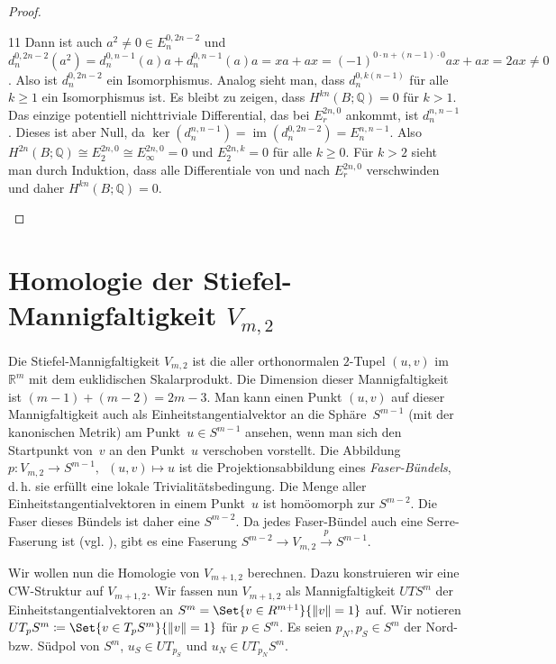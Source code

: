 \documentclass[11pt, a4paper, german]{article}
\theoremstyle{definition}
\theoremstyle{remark}
\newcommand{\R}{\mathbb{R}} %
\newcommand{\Q}{\mathbb{Q}} %
\DeclareMathOperator{\im}{im} %
\DeclarePairedDelimiter\norm{\lVert}{\rVert} %
\newcommand{\V}[2]{V_{{#2},{#1}}} %
\begin{document}
\begin{proof}
\begin{cutout}{0}{0pt}{\dimexpr\linewidth-5.5cm\relax}{11}
    Dann ist auch $a^2 \neq 0 \in E_n^{0,2n-2}$ und $d_n^{0,2n-2}(a^2) = d_n^{0,n-1}(a)a + d_n^{0,n-1}(a)a = xa + ax = (-1)^{0 \cdot n + (n-1) \cdot 0} ax + ax = 2ax \neq 0$.
    Also ist $d_n^{0,2n-2}$ ein Isomorphismus.
    Analog sieht man, dass $d_n^{0,k(n-1)}$ für alle $k \geq 1$ ein Isomorphismus ist.
    Es bleibt zu zeigen, dass $H^{kn}(B; \Q) = 0$ für $k > 1$.
    Das einzige potentiell nichttriviale Differential, das bei $E_r^{2n,0}$ ankommt, ist $d_n^{n,n-1}$.
    Dieses ist aber Null, da $\ker(d_n^{n,n-1}) = \im(d_n^{0,2n-2}) = E_n^{n,n-1}$.
    Also $H^{2n}(B; \Q) \cong E_2^{2n,0} \cong E_\infty^{2n,0} = 0$ und $E_2^{2n,k} = 0$ für alle $k \geq 0$.
    Für $k > 2$ sieht man durch Induktion, dass alle Differentiale von und nach $E_r^{2n,0}$ verschwinden und daher $H^{kn}(B; \Q) = 0$. \qedhere
  \end{cutout}
\end{proof}

\section{Homologie der Stiefel-Mannigfaltigkeit $\V{2}{m}$}

Die Stiefel-Mannigfaltigkeit $\V{2}{m}$ ist die aller orthonormalen $2$-Tupel $(u, v)$ im $\R^m$ mit dem euklidischen Skalarprodukt.
Die Dimension dieser Mannigfaltigkeit ist $(m-1) + (m-2) = 2m - 3$.
Man kann einen Punkt $(u, v)$ auf dieser Mannigfaltigkeit auch als Einheitstangentialvektor an die Sphäre~$S^{m-1}$ (mit der kanonischen Metrik) am Punkt~$u \in S^{m-1}$ ansehen, wenn man sich den Startpunkt von~$v$ an den Punkt~$u$ verschoben vorstellt.
Die Abbildung $p : \V{2}{m} \to S^{m-1}, \enspace (u, v) \mapsto u$ ist die Projektionsabbildung eines \emph{Faser-Bündels}, d.\,h. sie erfüllt eine lokale Trivialitätsbedingung.
Die Menge aller Einheitstangentialvektoren in einem Punkt~$u$ ist homöomorph zur $S^{m-2}$.
Die Faser dieses Bündels ist daher eine $S^{m-2}$.
Da jedes Faser-Bündel auch eine Serre-Faserung ist (vgl. \cite[\mbox{} Prop 4.48]{hatcher:at}), gibt es eine Faserung $S^{m-2} \to \V{2}{m} \xrightarrow{p} S^{m-1}$.

Wir wollen nun die Homologie von $\V{2}{m+1}$ berechnen.
Dazu konstruieren wir eine CW-Struktur auf $\V{2}{m+1}$.
Wir fassen nun $\V{2}{m+1}$ als Mannigfaltigkeit $UT S^m$ der Einheitstangentialvektoren an $S^m = \Set{v \in R^{m+1}}{\norm{v} = 1}$ auf.
Wir notieren $UT_p S^m \coloneqq \Set{v \in T_p S^m}{\norm{v} = 1}$ für $p \in S^m$.
Es seien $p_N, p_S \in S^m$ der Nord- bzw. Südpol von $S^m$, $u_S \in UT_{p_S}$ und $u_N \in UT_{p_N} S^m$.
\end{document}
